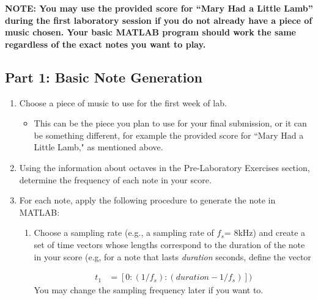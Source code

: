 \documentclass[12pt]{article}
\begin{document}
 \textbf{NOTE: You may use the provided score for ``Mary Had a Little Lamb'' during the first laboratory session if you do not already have a piece of music chosen. Your basic MATLAB program should work the same regardless of the exact notes you want to play.}
\subsection{Part 1: Basic Note Generation}
\begin{enumerate}


\item Choose a piece of music to use for the first week of lab. 
\begin{itemize}[nosep]
    \item This can be the piece you plan to use for your final submission, or it can be something different, for example the provided score for ``Mary Had a Little Lamb," as mentioned above. 
\end{itemize}

\item Using the information about octaves in the Pre-Laboratory Exercises section, determine the frequency of each note in your score. 
\item For each note, apply the following procedure to generate the note in MATLAB:
\begin{enumerate}
    \item Choose a sampling rate (e.g., a sampling rate of $f_s$= 8kHz) and create a set of time vectors whose lengths correspond to the duration of the note in your score (e.g, for a note that lasts \textit{duration} seconds, define the vector

    \vspace{-.3in}
    \Large
    \begin{align*}
     t_1 &= [0:(1/f_s):(duration-1/f_s)])
    \end{align*}
    \normalsize
    You may change the sampling frequency later if you want to. 


\end{enumerate}
\end{enumerate}
\end{document}
